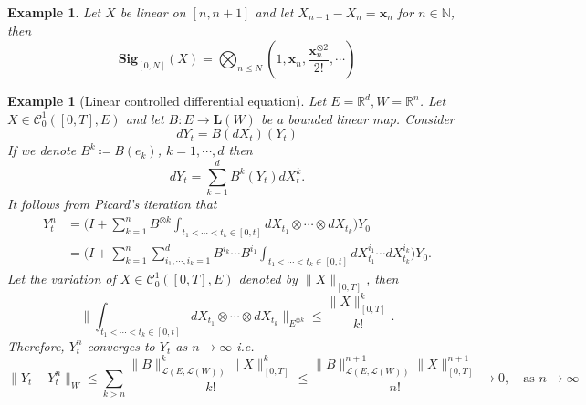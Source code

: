\documentclass[12pt]{report}
\newtheorem{example}[theorem]{Example}
\theoremstyle{definition}
\theoremstyle{remark}
\newcommand{\R}{\mathbb{R}}
\newcommand{\N}{\mathbb{N}}
\begin{document}
\begin{example}\label{linear_chern}
  Let $X$ be linear on $[n,n+1]$ and let $X_{n+1} - X_{n} = \mathbf{x}_{n}$ for $n \in \N$, then 
  \begin{equation}
    \mathbf{Sig}_{[0,N]}(X) = \bigotimes_{n \leq N}(1, \mathbf{x}_{n},\frac{\mathbf{x}_{n}^{\otimes 2}}{2!}, \cdots) 
  \end{equation}
\end{example}


\begin{example}[Linear controlled differential equation]\label{lcde}
  Let $E = \R^{d}, W = \R^{n}$. Let $X \in \mathcal{C}^{1}_{0}([0,T],E)$ and let $B\colon E \to \mathbf{L}(W)$ be a bounded linear map. Consider 
  \begin{equation}
    dY_t = B(dX_{t})(Y_{t})
  \end{equation}
  If we denote $B^{k} \coloneq B(e_{k})$, $k = 1,\cdots, d$ then 
  \begin{equation}\label{linear_control}
    dY_t = \sum_{k=1}^{d}B^{k}(Y_{t})dX^{k}_{t}.
  \end{equation}
  It follows from Picard's iteration that 
  \begin{equation}
    \begin{split}
      Y^{n}_{t} &= \Bigg(I + \sum_{k=1}^{n}B^{\otimes k}\int_{t_{1}<\cdots< t_{k} \in [0,t]}dX_{t_{1}}\otimes\cdots\otimes dX_{t_{k}}\Bigg) Y_{0}\\ 
      &= \Bigg(I + \sum_{k=1}^{n}\sum_{i_{1},\cdots,i_{k} = 1}^{d}B^{i_{k}}\cdots B^{i_{1}}\int_{t_{1}<\cdots< t_{k} \in [0,t]}dX_{t_{1}}^{i_{1}}\cdots dX_{t_{k}}^{i_{k}}\Bigg) Y_{0}.
    \end{split}
  \end{equation}
  Let the variation of $X \in \mathcal{C}^{1}_{0}([0,T],E)$ denoted by $\lVert X \rVert_{[0,T]}$, then 
  \begin{equation}
      \Big\lVert \int_{t_{1}<\cdots< t_{k} \in [0,t]}dX_{t_{1}}\otimes\cdots\otimes dX_{t_{k}} \Big\rVert_{E^{\otimes k}} \leq \frac{\lVert X \rVert_{[0,T]}^{k}}{k!}.
  \end{equation}
  Therefore, $Y^{n}_{t}$ converges to $Y_{t}$ as $n \to \infty$ i.e. 
  \begin{equation}
    \lVert Y_{t} - Y^{n}_{t}\rVert_{W} \leq \sum_{k > n}\frac{\lVert B\rVert_{\mathcal{L}(E,\mathcal{L}(W))}^{k}\lVert X \rVert_{[0,T]}^{k}}{k!}  \leq \frac{\lVert B\rVert_{\mathcal{L}(E,\mathcal{L}(W))}^{n+1}\lVert X \rVert_{[0,T]}^{n+1}}{n!} \to 0,\quad \text{as } n \to \infty
  \end{equation}

\end{example}
\end{document}

